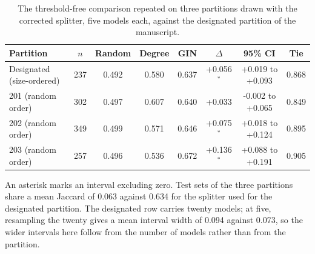 \begin{table}[htbp]
\centering
\caption{The threshold-free comparison repeated on three partitions drawn with the corrected splitter, five models each, against the designated partition of the manuscript.}
\label{tab:replication}
\footnotesize
\setlength{\tabcolsep}{4pt}
\begin{tabular}{lccccccc}
\toprule
Partition & $n$ & Random & Degree & GIN & $\Delta$ & 95\% CI & Tie \\
\midrule
Designated (size-ordered) & 237 & 0.492 & 0.580 & 0.637 & +0.056$^{*}$ & +0.019 to +0.093 & 0.868 \\
201 (random order) & 302 & 0.497 & 0.607 & 0.640 & +0.033 & -0.002 to +0.065 & 0.849 \\
202 (random order) & 349 & 0.499 & 0.571 & 0.646 & +0.075$^{*}$ & +0.018 to +0.124 & 0.895 \\
203 (random order) & 257 & 0.496 & 0.536 & 0.672 & +0.136$^{*}$ & +0.088 to +0.191 & 0.905 \\
\bottomrule
\end{tabular}
\begin{flushleft}\footnotesize An asterisk marks an interval excluding zero. Test sets of the three partitions share a mean Jaccard of 0.063 against 0.634 for the splitter used for the designated partition. The designated row carries twenty models; at five, resampling the twenty gives a mean interval width of 0.094 against 0.073, so the wider intervals here follow from the number of models rather than from the partition.\end{flushleft}
\end{table}
